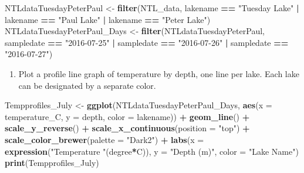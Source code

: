 \documentclass[]{article}
\newenvironment{Shaded}{\begin{snugshade}}{\end{snugshade}}
\newcommand{\DataTypeTok}[1]{\textcolor[rgb]{0.13,0.29,0.53}{#1}}
\newcommand{\KeywordTok}[1]{\textcolor[rgb]{0.13,0.29,0.53}{\textbf{#1}}}
\newcommand{\NormalTok}[1]{#1}
\newcommand{\OperatorTok}[1]{\textcolor[rgb]{0.81,0.36,0.00}{\textbf{#1}}}
\newcommand{\StringTok}[1]{\textcolor[rgb]{0.31,0.60,0.02}{#1}}
\providecommand{\tightlist}{%
  \setlength{\itemsep}{0pt}\setlength{\parskip}{0pt}}
\begin{document}
\begin{Shaded}
\begin{Highlighting}[]
\NormalTok{NTLdataTuesdayPeterPaul <-}\StringTok{ }\KeywordTok{filter}\NormalTok{(NTL_data, }
\NormalTok{                                  lakename }\OperatorTok{==}\StringTok{ "Tuesday Lake"} \OperatorTok{|}\StringTok{ }\NormalTok{lakename }\OperatorTok{==}\StringTok{ "Paul Lake"} \OperatorTok{|}
\StringTok{                                    }\NormalTok{lakename }\OperatorTok{==}\StringTok{ "Peter Lake"}\NormalTok{)}
\NormalTok{NTLdataTuesdayPeterPaul_Days <-}\StringTok{ }\KeywordTok{filter}\NormalTok{(NTLdataTuesdayPeterPaul, }
\NormalTok{                                       sampledate }\OperatorTok{==}\StringTok{ "2016-07-25"} \OperatorTok{|}
\StringTok{                                         }\NormalTok{sampledate }\OperatorTok{==}\StringTok{ "2016-07-26"} \OperatorTok{|}
\StringTok{                                         }\NormalTok{sampledate }\OperatorTok{==}\StringTok{ "2016-07-27"}\NormalTok{)}
\end{Highlighting}
\end{Shaded}

\begin{enumerate}
\def\labelenumi{\arabic{enumi}.}
\setcounter{enumi}{8}
\tightlist
\item
  Plot a profile line graph of temperature by depth, one line per lake.
  Each lake can be designated by a separate color.
\end{enumerate}

\begin{Shaded}
\begin{Highlighting}[]
\NormalTok{Tempprofiles_July <-}\StringTok{ }
\StringTok{  }\KeywordTok{ggplot}\NormalTok{(NTLdataTuesdayPeterPaul_Days, }
         \KeywordTok{aes}\NormalTok{(}\DataTypeTok{x =}\NormalTok{ temperature_C, }\DataTypeTok{y =}\NormalTok{ depth, }\DataTypeTok{color =}\NormalTok{ lakename)) }\OperatorTok{+}
\StringTok{  }\KeywordTok{geom_line}\NormalTok{() }\OperatorTok{+}
\StringTok{  }\KeywordTok{scale_y_reverse}\NormalTok{() }\OperatorTok{+}
\StringTok{  }\KeywordTok{scale_x_continuous}\NormalTok{(}\DataTypeTok{position =} \StringTok{"top"}\NormalTok{) }\OperatorTok{+}
\StringTok{  }\KeywordTok{scale_color_brewer}\NormalTok{(}\DataTypeTok{palette =} \StringTok{"Dark2"}\NormalTok{) }\OperatorTok{+}\StringTok{ }
\StringTok{  }\KeywordTok{labs}\NormalTok{(}\DataTypeTok{x =} \KeywordTok{expression}\NormalTok{(}\StringTok{"Temperature "}\NormalTok{(degree}\OperatorTok{*}\NormalTok{C)), }\DataTypeTok{y =} \StringTok{"Depth (m)"}\NormalTok{, }
       \DataTypeTok{color =} \StringTok{"Lake Name"}\NormalTok{)}
\KeywordTok{print}\NormalTok{(Tempprofiles_July)}
\end{Highlighting}
\end{Shaded}
\end{document}
